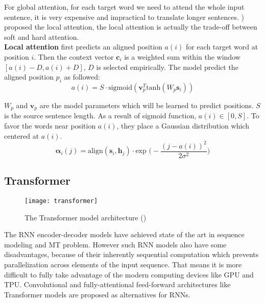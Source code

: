 For global attention, for each target word we need to attend the whole input sentence, it is very expensive and impractical to translate longer sentences. \cite{luong2015effective}) proposed the local attention, the local attention is actually the  trade-off between soft and hard attention. \\
\textbf{Local attention} first predicts an aligned position ${a(i)}$ for each target word at position $i$. Then the context vector ${\bm{c}_i}$ is a weighted sum within the window ${[a(i)-D, a(i)+D]}$, ${D}$ is selected empirically. The model predict the aligned  position ${p_i}$ as followed:
\[ a(i) = S \cdot \text{sigmoid}(\bm{v}_p^T \text{tanh}(W_p \bm{s}_i))\]

${W_p}$ and ${\bm{v}_p}$ are the model parameters which will be learned to predict positions. $S$ is the source sentence length. As a result of sigmoid function, $a(i) \in [0, S]$. To favor the words near position ${a(i)}$, they place a Gaussian distribution which centered at ${a(i)}$.
\[\bm{\alpha}_i(j) = \text{align}(\bm{s}_i, {\bm{h}}_j) \cdot \text{exp\ }\Big(-\frac{(j-a(i))^2}{2 \sigma^2}\Big) \]

\subsection{Transformer}
\begin{figure}[t]
	\texttt{[image: transformer]}
	\caption{The Transformer model architecture (\cite{vaswani2017attention})}
	\centering
\end{figure}
The RNN encoder-decoder models have achieved state of the art in sequence modeling and MT problem. However such RNN models also have some disadvantages, because of their inherently sequential computation which prevents parallelization across elements of the input sequence. That means it is more difficult to fully take advantage of the modern computing devices like GPU and TPU. Convolutional \cite{gehring2017convolutional} and fully-attentional feed-forward architectures like Transformer \cite{vaswani2017attention} models are proposed as alternatives for RNNs. \\

